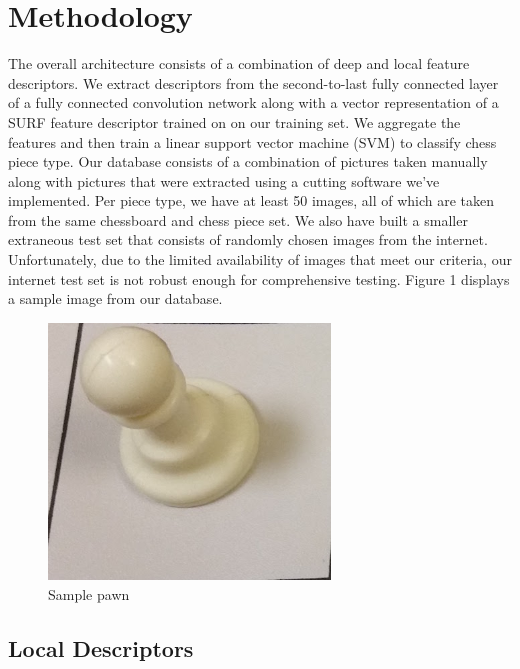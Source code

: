 \documentclass{article}
\begin{document}
\section{Methodology}
\label{sec:format}
\hspace{\parindent}The overall architecture consists of a combination of deep and local feature descriptors. We extract descriptors from the second-to-last fully connected layer of a fully connected convolution network along with a vector representation of a SURF feature descriptor trained on on our training set. We aggregate the features and then train a linear support vector machine (SVM) to classify chess piece type. Our database consists of a combination of pictures taken manually along with pictures that were extracted using a cutting software we've implemented. Per piece type, we have at least 50 images, all of which are taken from the same chessboard and chess piece set. We also have built a smaller extraneous test set that consists of randomly chosen images from the internet. Unfortunately, due to the limited availability of images that meet our criteria, our internet test set is not robust enough for comprehensive testing. Figure 1 displays a sample image from our database.
\newline
\begin{figure}[htb]

\begin{minipage}[b]{1.0\linewidth}
  \centering
  \centerline{\includegraphics[width=7.5cm]{sample}}

\end{minipage}
%

%
\caption{Sample pawn}
\label{fig:res}
%
\end{figure}
\subsection{Local Descriptors}
\label{ssec:subhead}
\end{document}
